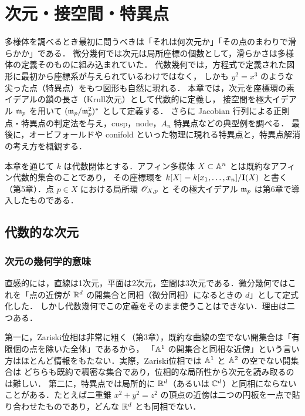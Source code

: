 \chapter{次元・接空間・特異点}
\label{ch:ch07}

\begin{chapterlead}
多様体を調べるとき最初に問うべきは「それは何次元か」「その点のまわりで滑らかか」である．
微分幾何では次元は局所座標の個数として，滑らかさは多様体の定義そのものに組み込まれていた．
代数幾何では，方程式で定義された図形に最初から座標系が与えられているわけではなく，
しかも $y^2=x^3$ のような尖った点（特異点）をもつ図形も自然に現れる．
本章では，次元を座標環の素イデアルの鎖の長さ（Krull次元）として代数的に定義し，
接空間を極大イデアル $\mathfrak{m}_p$ を用いて $(\mathfrak{m}_p/\mathfrak{m}_p^2)^*$ として定義する．
さらに Jacobian 行列による正則点・特異点の判定法を与え，cusp，node，$A_n$ 特異点などの典型例を調べる．
最後に，オービフォールドや conifold といった物理に現れる特異点と，特異点解消の考え方を概観する．
\end{chapterlead}

本章を通じて $k$ は代数閉体とする．アフィン多様体 $X\subset\mathbb{A}^n$ とは既約なアフィン代数的集合のことであり，
その座標環を $k[X]=k[x_1,\dots,x_n]/\mathbf{I}(X)$ と書く（第5章）．点 $p\in X$ における局所環 $\mathscr{O}_{X,p}$ と
その極大イデアル $\mathfrak{m}_p$ は第6章で導入したものである．

\section{代数的な次元}

\subsection{次元の幾何学的意味}

直感的には，直線は1次元，平面は2次元，空間は3次元である．微分幾何ではこれを「点の近傍が $\mathbb{R}^d$ の開集合と同相（微分同相）になるときの $d$」として定式化した．
しかし代数幾何でこの定義をそのまま使うことはできない．理由は二つある．

第一に，Zariski位相は非常に粗く（第3章），既約な曲線の空でない開集合は「有限個の点を除いた全体」であるから，
「$\mathbb{A}^1$ の開集合と同相な近傍」という言い方はほとんど情報をもたない．実際，Zariski位相では $\mathbb{A}^1$ と $\mathbb{A}^2$ の空でない開集合は
どちらも既約で稠密な集合であり，位相的な局所性から次元を読み取るのは難しい．
第二に，特異点では局所的に $\mathbb{R}^d$（あるいは $\mathbb{C}^d$）と同相にならないことがある．たとえば二重錐 $x^2+y^2=z^2$ の頂点の近傍は二つの円板を一点で貼り合わせたものであり，どんな $\mathbb{R}^d$ とも同相でない．

